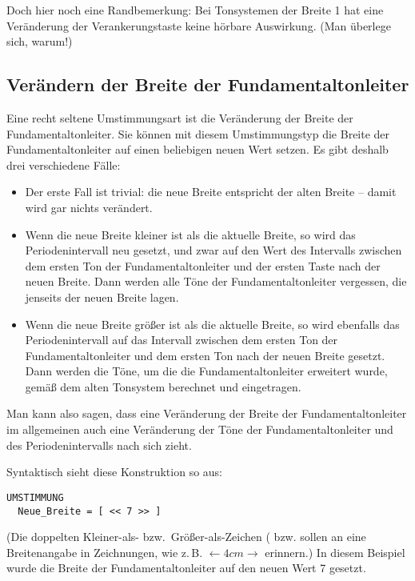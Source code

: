 Doch hier noch eine Randbemerkung: Bei Tonsystemen der Breite 1
hat eine Veränderung der Verankerungstaste keine hörbare
Auswirkung. (Man überlege sich, warum!)

\subsection{Verändern der Breite der Fundamentaltonleiter}\label{sec:verandern-der-breite}

Eine recht seltene Umstimmungsart ist die Veränderung der Breite 
der Fundamentaltonleiter. Sie können mit diesem Umstimmungstyp 
die Breite der Fundamentaltonleiter auf einen beliebigen neuen Wert setzen. 
Es gibt deshalb drei verschiedene Fälle:

\begin{itemize}

\item Der erste Fall ist trivial: die neue Breite entspricht der alten
  Breite -- damit wird gar nichts verändert.

\item Wenn die neue Breite kleiner ist als die aktuelle Breite, so
  wird das Periodenintervall neu gesetzt, und zwar auf den Wert des
  Intervalls zwischen dem ersten Ton der Fundamentaltonleiter und der ersten Taste nach
  der neuen Breite. Dann werden alle Töne der Fundamentaltonleiter vergessen, die
  jenseits der neuen Breite lagen.

\item Wenn die neue Breite größer ist als die aktuelle Breite, so wird
  ebenfalls das Periodenintervall auf das Intervall zwischen dem
  ersten Ton der Fundamentaltonleiter und dem ersten Ton nach der neuen Breite gesetzt.
  Dann werden die Töne, um die die Fundamentaltonleiter erweitert wurde, gemäß dem alten
  Tonsystem berechnet und eingetragen.

\end{itemize} 

Man kann also sagen, dass eine Veränderung der Breite der Fundamentaltonleiter 
im allgemeinen auch eine Veränderung der Töne der Fundamentaltonleiter und 
des Periodenintervalls nach sich zieht.


Syntaktisch sieht diese Konstruktion so aus:
\begin{verbatim}
UMSTIMMUNG
  Neue_Breite = [ << 7 >> ]
\end{verbatim}
(Die doppelten Kleiner-als- bzw.\ Größer-als-Zeichen (\sourcecode{<<} bzw.
\sourcecode{>>} sollen an eine Breitenangabe in Zeichnungen, wie z.\,B.
\mbox{$\longleftarrow 4 cm \longrightarrow$} erinnern.) In diesem
Beispiel wurde die Breite der Fundamentaltonleiter auf den neuen Wert 7 gesetzt.

